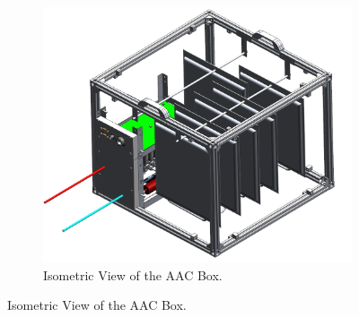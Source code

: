 \documentclass[a4paper,12pt,twoside]{article}
\providecommand{\DIFaddbeginFL}{} %
\providecommand{\DIFaddendFL}{} %
\providecommand{\DIFdelbeginFL}{} %
\providecommand{\DIFdelendFL}{} %
\newcommand{\DIFscaledelfig}{0.5}
\newlength{\DIFdelgraphicswidth} %
\newlength{\DIFdelgraphicsheight} %
\newcommand{\DIFaddincludegraphics}[2][]{{\color{blue}\fbox{\DIFOincludegraphics[#1]{#2}}}} %
\newcommand{\DIFdelincludegraphics}[2][]{%
\sbox{\DIFdelgraphicsbox}{\DIFOincludegraphics[#1]{#2}}%
\settoboxwidth{\DIFdelgraphicswidth}{\DIFdelgraphicsbox} %
\settoboxtotalheight{\DIFdelgraphicsheight}{\DIFdelgraphicsbox} %
\scalebox{\DIFscaledelfig}{%
\parbox[b]{\DIFdelgraphicswidth}{\usebox{\DIFdelgraphicsbox}\\[-\baselineskip] \rule{\DIFdelgraphicswidth}{0em}}\llap{\resizebox{\DIFdelgraphicswidth}{\DIFdelgraphicsheight}{%
\setlength{\unitlength}{\DIFdelgraphicswidth}%
\begin{picture}(1,1)%
\thicklines\linethickness{2pt} %
{\color[rgb]{1,0,0}\put(0,0){\framebox(1,1){}}}%
{\color[rgb]{1,0,0}\put(0,0){\line( 1,1){1}}}%
{\color[rgb]{1,0,0}\put(0,1){\line(1,-1){1}}}%
\end{picture}%
}\hspace*{3pt}}} %
} %
\DeclareRobustCommand{\DIFaddbeginFL}{\DIFOaddbeginFL \let\includegraphics\DIFaddincludegraphics} %
\DeclareRobustCommand{\DIFaddendFL}{\DIFOaddendFL \let\includegraphics\DIFOincludegraphics} %
\DeclareRobustCommand{\DIFdelbeginFL}{\DIFOdelbeginFL \let\includegraphics\DIFdelincludegraphics} %
\DeclareRobustCommand{\DIFdelendFL}{\DIFOaddendFL \let\includegraphics\DIFOincludegraphics} %
\begin{document}
\begin{figure}[H]
    \centering
    \DIFdelbeginFL %
\DIFdelendFL \DIFaddbeginFL \begin{subfigure}[b]{0.47\textwidth}
        \includegraphics[width=\textwidth]{4-experiment-design/img/Mechanical/AAC_isometric_view.png}
         \DIFaddendFL \caption{Isometric View of the AAC Box.}
    \label{iso_aac}
    \DIFdelbeginFL %


\end{subfigure}
\end{figure}
\end{document}
